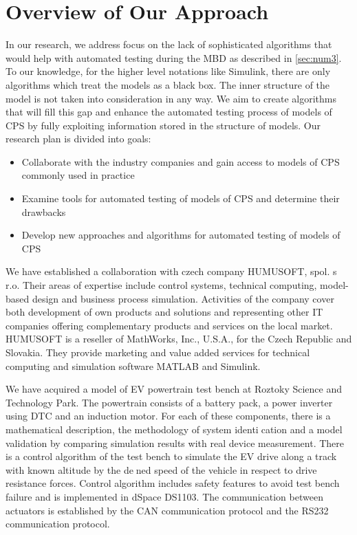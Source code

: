 \chapter{Overview of Our Approach}
\label{chap.ourapproach}

In our research, we address focus on the lack of sophisticated algorithms that would help with automated testing during the MBD as described in \ref{sec:num3}. To our knowledge, for the higher level notations like Simulink, there are only algorithms which treat the models as a black box. The inner structure of the model is not taken into consideration in any way. We aim to create algorithms that will fill this gap and enhance the automated testing process of models of CPS by fully exploiting information stored in the structure of models. Our research plan is divided into goals:

\begin{itemize}
	\item Collaborate with the industry companies and gain access to models of CPS commonly used in practice
	\item Examine tools for automated testing of models of CPS and determine their drawbacks
	\item Develop new approaches and algorithms for automated testing of models of CPS
\end{itemize}

We have established a collaboration with czech company HUMUSOFT, spol. s r.o. Their areas of expertise include control systems, technical computing, model-based design and business process simulation. Activities of the company cover both development of own products and solutions and representing other IT companies offering complementary products and services on the local market. HUMUSOFT is a reseller of MathWorks, Inc., U.S.A., for the Czech Republic and Slovakia. They provide marketing and value added services for technical computing and simulation software MATLAB and Simulink.

We have acquired a model of EV powertrain test bench at Roztoky Science and Technology Park. The powertrain consists of a battery pack, a power inverter using DTC and an induction motor. For each of these components, there is a mathematical description, the methodology of system identication and a model validation by comparing simulation results with real device measurement. There is a control algorithm of the test bench to simulate the EV drive along a track with known altitude by the dened speed of the vehicle in respect to drive resistance forces. Control algorithm includes safety features to avoid test bench failure and is implemented in dSpace DS1103. The communication between actuators is established by the CAN communication protocol and the RS232 communication protocol.

